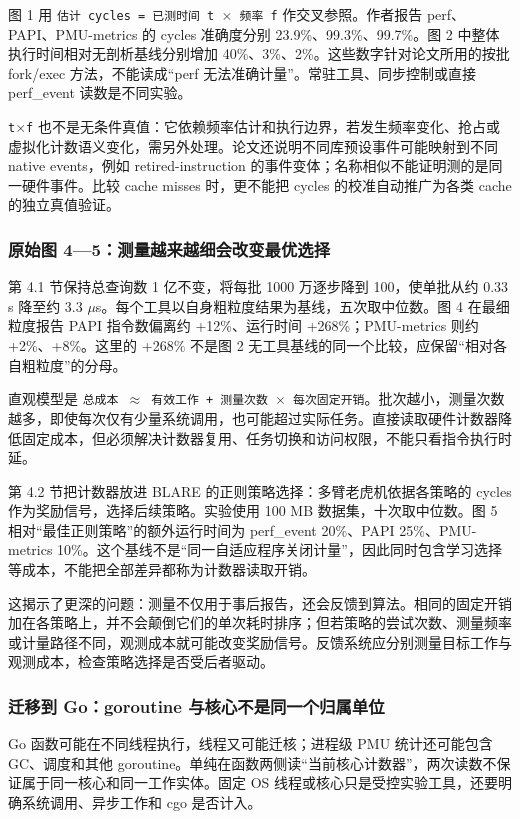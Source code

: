 \documentclass[UTF8,fontset=fandol,openany,11pt]{ctexbook}
\begin{document}
图 1 用 \texttt{估计 cycles = 已测时间 t \ensuremath{\times} 频率 f} 作交叉参照。作者报告 perf、PAPI、PMU-metrics 的 cycles 准确度分别 23.9\%、99.3\%、99.7\%。图 2 中整体执行时间相对无剖析基线分别增加 40\%、3\%、2\%。这些数字针对论文所用的按批 fork/exec 方法，不能读成“perf 无法准确计量”。常驻工具、同步控制或直接 perf\_event 读数是不同实验。

\texttt{t\ensuremath{\times}f} 也不是无条件真值：它依赖频率估计和执行边界，若发生频率变化、抢占或虚拟化计数语义变化，需另外处理。论文还说明不同库预设事件可能映射到不同 native events，例如 retired-instruction 的事件变体；名称相似不能证明测的是同一硬件事件。比较 cache misses 时，更不能把 cycles 的校准自动推广为各类 cache 的独立真值验证。

\subsubsection{原始图 4—5：测量越来越细会改变最优选择}
第 4.1 节保持总查询数 1 亿不变，将每批 1000 万逐步降到 100，使单批从约 0.33 s 降至约 3.3 \ensuremath{\mu}s。每个工具以自身粗粒度结果为基线，五次取中位数。图 4 在最细粒度报告 PAPI 指令数偏离约 +12\%、运行时间 +268\%；PMU-metrics 则约 +2\%、+8\%。这里的 +268\% 不是图 2 无工具基线的同一个比较，应保留“相对各自粗粒度”的分母。

直观模型是 \texttt{总成本 \ensuremath{\approx} 有效工作 + 测量次数 \ensuremath{\times} 每次固定开销}。批次越小，测量次数越多，即使每次仅有少量系统调用，也可能超过实际任务。直接读取硬件计数器降低固定成本，但必须解决计数器复用、任务切换和访问权限，不能只看指令执行时延。

第 4.2 节把计数器放进 BLARE 的正则策略选择：多臂老虎机依据各策略的 cycles 作为奖励信号，选择后续策略。实验使用 100 MB 数据集，十次取中位数。图 5 相对“最佳正则策略”的额外运行时间为 perf\_event 20\%、PAPI 25\%、PMU-metrics 10\%。这个基线不是“同一自适应程序关闭计量”，因此同时包含学习选择等成本，不能把全部差异都称为计数器读取开销。

这揭示了更深的问题：测量不仅用于事后报告，还会反馈到算法。相同的固定开销加在各策略上，并不会颠倒它们的单次耗时排序；但若策略的尝试次数、测量频率或计量路径不同，观测成本就可能改变奖励信号。反馈系统应分别测量目标工作与观测成本，检查策略选择是否受后者驱动。

\subsubsection{迁移到 Go：goroutine 与核心不是同一个归属单位}
Go 函数可能在不同线程执行，线程又可能迁核；进程级 PMU 统计还可能包含 GC、调度和其他 goroutine。单纯在函数两侧读“当前核心计数器”，两次读数不保证属于同一核心和同一工作实体。固定 OS 线程或核心只是受控实验工具，还要明确系统调用、异步工作和 cgo 是否计入。
\end{document}

